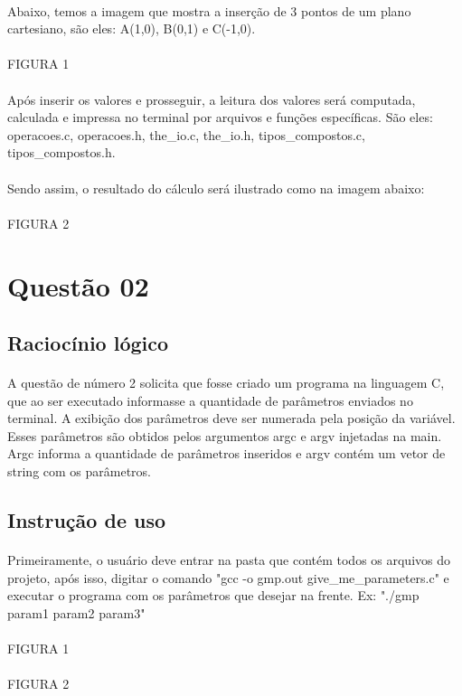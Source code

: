 \documentclass[11pt]{article}
\begin{document}
        \paragraph{}	Abaixo, temos a imagem que mostra a inser\c{c}\~ao de 3 pontos de um plano cartesiano, s\~ao eles: A(1,0), B(0,1) e C(-1,0). 
        \paragraph{}	FIGURA 1
        \paragraph{}	Ap\'os inserir os valores e prosseguir, a leitura dos valores ser\'a computada, calculada e impressa no terminal por arquivos e fun\c{c}\~oes espec\'ificas. S\~ao eles: operacoes.c, operacoes.h, the\_io.c, the\_io.h, tipos\_compostos.c, tipos\_compostos.h. 
        \paragraph{}	Sendo assim, o resultado do c\'alculo ser\'a ilustrado como na imagem abaixo:
        \paragraph{}	FIGURA 2
\section{Quest\~ao 02}
    \subsection{Racioc\'inio l\'ogico}
        \paragraph{}    A questão de número 2 solicita que fosse criado um programa na linguagem C, que ao ser executado informasse a quantidade de parâmetros enviados no terminal. A exibição dos parâmetros deve ser numerada pela posição da variável. Esses parâmetros são obtidos pelos argumentos argc e argv injetadas na main. Argc informa a quantidade de parâmetros inseridos e argv contém um vetor de string com os parâmetros.
	\subsection{Instru\c{c}\~ao de uso}
        \paragraph{}    Primeiramente, o usuário deve entrar na pasta que contém todos os arquivos do projeto, após isso, digitar o comando "gcc -o gmp.out give_me_parameters.c" e executar o programa com os parâmetros que desejar na frente. Ex: "./gmp param1 param2 param3"
        \paragraph{}    FIGURA 1
        \paragraph{}    FIGURA 2
\end{document}
